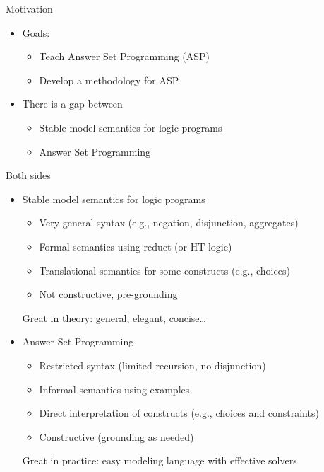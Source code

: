 \begin{frame}{Motivation}
\begin{itemize}
  \vfill
  \item<1->\alert<1>{Goals}:
  \begin{itemize}
    \item Teach Answer Set Programming (ASP)
    \item Develop a methodology for ASP
  \end{itemize}
  \bigskip
  \bigskip
  \item<2->There is a \alert<2>{gap} between
  \begin{itemize}
    \item Stable model semantics for \alert<2>{logic} programs
    \item Answer Set \alert<2>{Programming}
  \end{itemize}
  \vfill
\end{itemize}
\end{frame}

\begin{frame}{Both sides}
\begin{itemize}

  \item<1-> \alert<1>{Stable model semantics} for logic programs
  \begin{itemize}
    \item Very general syntax (e.g., negation, disjunction, aggregates)
    \item \alert<1>{Formal semantics} using reduct (or HT-logic)
    \item Translational semantics for some constructs (e.g., choices)
    \item Not constructive, pre-grounding
  \end{itemize}
  Great in theory: general, elegant, concise\ldots 
  \bigskip\bigskip
  \item<2-> \alert<2>{Answer Set Programming} 
  \begin{itemize}
    \item Restricted syntax (limited recursion, no disjunction)
    \item \alert<2>{Informal semantics} using examples
    \item Direct interpretation of constructs (e.g., choices and constraints)
    \item Constructive (grounding as needed)
  \end{itemize}
  Great in practice: easy modeling language with effective solvers

\end{itemize}
\end{frame}

